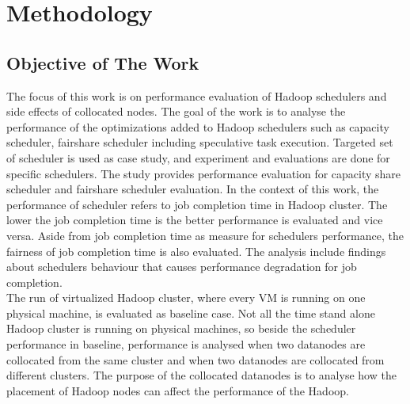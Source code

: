 
\chapter{Methodology } %

\label{Chapter4} %



\section{Objective of The Work}

The focus of this work is on performance evaluation of Hadoop schedulers and side effects of collocated nodes. The goal of the work is to analyse the performance of the optimizations added to Hadoop schedulers such as capacity scheduler, fairshare scheduler including speculative task execution. Targeted set of scheduler is used as case study, and experiment and evaluations are done for specific schedulers. The study provides performance evaluation for capacity share scheduler and fairshare scheduler evaluation. In the context of this work, the performance of scheduler refers to job completion time in Hadoop cluster. The lower the job completion time is the better performance is evaluated and vice versa. Aside from job completion time as measure for schedulers performance, the fairness of job completion time is also evaluated. The analysis include findings about schedulers behaviour that causes performance degradation for job completion.\\
 
 The run of virtualized Hadoop cluster, where every VM‌ is running on one physical machine, is evaluated as baseline case. Not all the time stand alone Hadoop cluster is running on physical machines, so beside the scheduler performance in baseline, performance is analysed when two datanodes are collocated from the same cluster and when two datanodes are collocated from different clusters. The purpose of the collocated datanodes is to analyse how the placement of Hadoop nodes can affect the performance of the Hadoop. 


